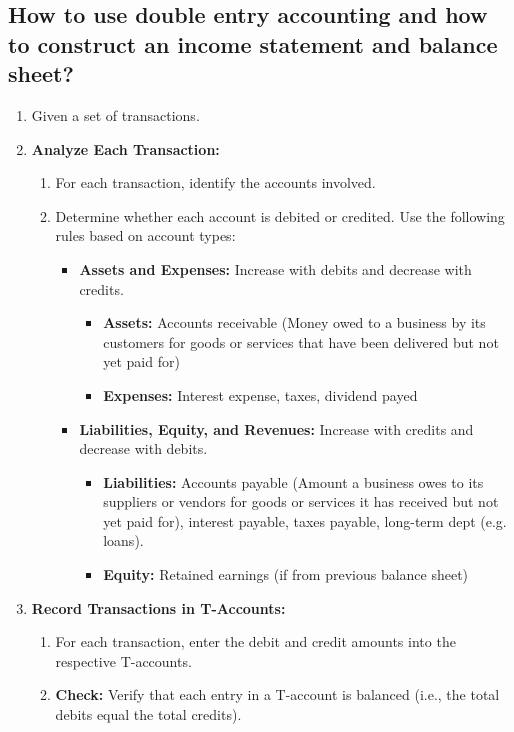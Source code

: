 \subsection{How to use double entry accounting and how to construct an income statement and balance sheet?}
\begin{process}
    \begin{enumerate}
        \item Given a set of transactions.
        \item \textbf{Analyze Each Transaction:} 
        \begin{enumerate}
            \item For each transaction, identify the accounts involved.
            \item Determine whether each account is debited or credited. Use the following rules based on account types:
            \begin{itemize}
                \item \textbf{Assets and Expenses:} Increase with debits and decrease with credits.
                \begin{itemize}
                    \item \textbf{Assets:} Accounts receivable (Money owed to a business by its customers for goods or services that have been delivered but not yet paid for)
                    \item \textbf{Expenses:} Interest expense, taxes, dividend payed
                \end{itemize}
                \item \textbf{Liabilities, Equity, and Revenues:} Increase with credits and decrease with debits.
                \begin{itemize}
                    \item \textbf{Liabilities:} Accounts payable (Amount a business owes to its suppliers or vendors for goods or services it has received but not yet paid for), interest payable, taxes payable, long-term dept (e.g. loans).
                    \item \textbf{Equity:} Retained earnings (if from previous balance sheet)
                \end{itemize}
            \end{itemize}
        \end{enumerate}
    
        \item \textbf{Record Transactions in T-Accounts:} 
        \begin{enumerate}
            \item For each transaction, enter the debit and credit amounts into the respective T-accounts.
            \item \textbf{Check:} Verify that each entry in a T-account is balanced (i.e., the total debits equal the total credits).
        \end{enumerate}
    

\end{enumerate}
\end{process}
